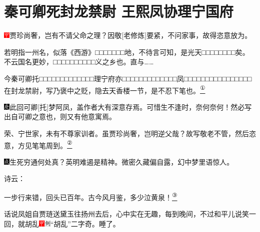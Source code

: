 

\chapter{秦可卿死封龙禁尉 王熙凤协理宁国府}

\includegraphics[width=3mm]{../Images/00002}{贾珍尚奢，岂有不请父命之理？因敬{[}老修炼{]}要紧，不问家事，故得恣意放为。}

{若明指一州名，似落《西游》□□□□□□□地，不待言可知，是光天□□□□□□□□矣。不云国名更妙，□□□□□□□□□□义之乡也。直与\ldots{}\ldots{}}

{今秦可卿托□□□□□□□□□□□□□理宁府亦□□□□□□□□□□□□□凤□□□□□□□□□□□□□□□□在封龙禁尉，写乃褒中之贬，隐去天香楼一节，是不忍下笔也。}\href{../Text/part0017_split_000.html\#lnkback_1_a}{\textsuperscript{①}}

{{\includegraphics[width=3mm]{../Images/00004}此回可卿{[}托{]}梦阿凤，盖作者大有深意存焉。可惜生不逢时，奈何奈何！然必写出自可卿之意也，则又有他意寓焉。}}

{{荣、宁世家，未有不尊家训者。虽贾珍尚奢，岂明逆父哉？故写敬老不管，然后恣意，方见笔笔周到。}}\href{../Text/part0017_split_000.html\#lnkback_2_a}{\textsuperscript{②}}

{\includegraphics[width=3mm]{../Images/00005}生死穷通何处真？英明难遏是精神。微密久藏偏自露，幻中梦里语惊人。}

诗云：

一步行来错，回头已百年。古今风月鉴，多少泣黄泉！\href{../Text/part0017_split_000.html\#lnkback_3_a}{\textsuperscript{③}}

话说凤姐自贾琏送黛玉往扬州去后，心中实在无趣，每到晚间，不过和平儿说笑一回，就胡乱{\includegraphics[width=3mm]{../Images/00002}\includegraphics[width=3mm]{../Images/00011}\footnotesize \kaishu ``胡乱''二字奇。}睡了。

